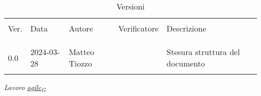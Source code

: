 \documentclass[12pt]{article} %
\begin{document}


\newpage



\begin{table}[!h]
	\caption*{Versioni}
	\begin{center}
		\begin{tabular}{ l l l l p{9cm} }
			\hline                                                                             \\[-2ex]
			Ver. & Data       & Autore        & Verificatore & Descrizione                     \\
			\\[-2ex] \hline \\[-1.5ex]\\

			0.0  & 2024-03-28 & Matteo Tiozzo &              & Stesura struttura del documento \\
			\\[-1.5ex] \hline
		\end{tabular}
	\end{center}
\end{table}

\newpage

\tableofcontents

\newpage

\listoftables

\listoffigures

\newpage

\textit{Lavoro \href{https://7last.github.io/docs/rtb/documentazione-interna/glossario\#agile}{agile\textsubscript{G}}}










\end{document}

